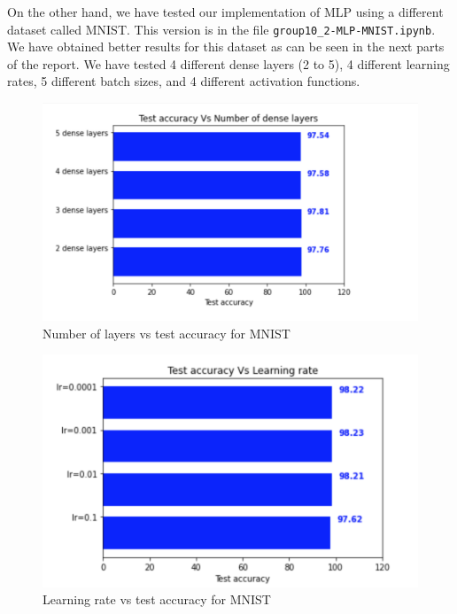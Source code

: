 \documentclass[conference]{IEEEtran}
\begin{document}
On the other hand, we have tested our implementation of MLP using a different dataset called MNIST. This version is in the file \texttt{group10\_2-MLP-MNIST.ipynb}. We have obtained better results for this dataset as can be seen in the next parts of the report.
We have tested 4 different dense layers (2 to 5), 4 different learning rates, 5 different batch sizes, and 4 different activation functions.

\begin{figure}[H]
\centering
\includegraphics[scale = 0.50]{figs/layers_MNIST.png}
\caption{Number of layers vs test accuracy for MNIST}
\label{fig:layersMNIST}
\end{figure}

\begin{figure}[H]
\centering
\includegraphics[scale = 0.50]{figs/learningrate_MNIST.png}
\caption{Learning rate vs test accuracy for MNIST}
\label{fig:learningRateFunctionMNIST}
\end{figure}
\end{document}
